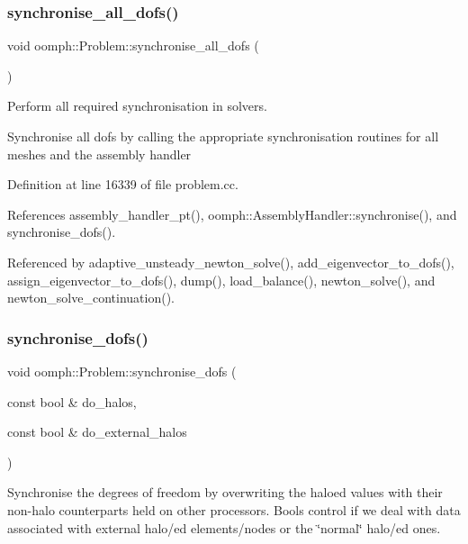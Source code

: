 \subsubsection{\texorpdfstring{synchronise\+\_\+all\+\_\+dofs()}{synchronise\_all\_dofs()}}
{\footnotesize\ttfamily void oomph\+::\+Problem\+::synchronise\+\_\+all\+\_\+dofs (\begin{DoxyParamCaption}{ }\end{DoxyParamCaption})}



Perform all required synchronisation in solvers. 

Synchronise all dofs by calling the appropriate synchronisation routines for all meshes and the assembly handler 

Definition at line 16339 of file problem.\+cc.



References assembly\+\_\+handler\+\_\+pt(), oomph\+::\+Assembly\+Handler\+::synchronise(), and synchronise\+\_\+dofs().



Referenced by adaptive\+\_\+unsteady\+\_\+newton\+\_\+solve(), add\+\_\+eigenvector\+\_\+to\+\_\+dofs(), assign\+\_\+eigenvector\+\_\+to\+\_\+dofs(), dump(), load\+\_\+balance(), newton\+\_\+solve(), and newton\+\_\+solve\+\_\+continuation().

\mbox{\label{classoomph_1_1Problem_a1ccef4e26a7788424780da7555cdc772}} 
\subsubsection{\texorpdfstring{synchronise\+\_\+dofs()}{synchronise\_dofs()}}
{\footnotesize\ttfamily void oomph\+::\+Problem\+::synchronise\+\_\+dofs (\begin{DoxyParamCaption}\item[{const bool \&}]{do\+\_\+halos,  }\item[{const bool \&}]{do\+\_\+external\+\_\+halos }\end{DoxyParamCaption})}



Synchronise the degrees of freedom by overwriting the haloed values with their non-\/halo counterparts held on other processors. Bools control if we deal with data associated with external halo/ed elements/nodes or the \char`\"{}normal\char`\"{} halo/ed ones. 

